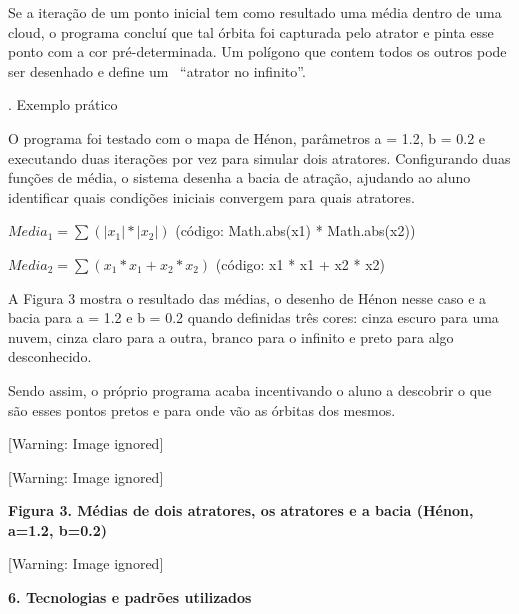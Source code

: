 \documentclass[12pt,twoside]{article}
\begin{document}
{
 Se a itera\c{c}\~ao de um ponto inicial tem como resultado uma m\'edia
dentro de uma cloud, o programa conclu\'i que tal \'orbita foi
capturada pelo atrator e pinta esse ponto com a cor
pr\'e{}-determinada. Um pol\'igono que contem todos os outros pode ser
desenhado e define um \ ``atrator no infinito''.}

{. Exemplo pr\'atico}

{
O programa foi testado com o mapa de H\'enon, par\^ametros a = 1.2, b =
0.2 e executando duas itera\c{c}\~oes por vez para simular dois
atratores. Configurando duas fun\c{c}\~oes de m\'edia, o sistema
desenha a bacia de atra\c{c}\~ao, ajudando ao aluno identificar quais
condi\c{c}\~oes iniciais convergem para quais atratores.}

{
  $\mathit{Media}_{1}=\sum {(\left|{x_{1}}\right|\ast
\left|{x_{2}}\right|)}$ (c\'odigo: Math.abs(x1) * Math.abs(x2))}

{
  $\mathit{Media}_{2}=\sum {(x_{1}\ast x_{1}+x_{2}\ast x_{2})}$
(c\'odigo: x1 * x1 + x2 * x2)}

{
 A Figura 3 mostra o resultado das m\'edias, o desenho de H\'enon nesse
caso e a bacia para a = 1.2 e b = 0.2 quando definidas tr\^es cores:
cinza escuro para uma nuvem, cinza claro para a outra, branco para o
infinito e preto para algo desconhecido.}

{
 Sendo assim, o pr\'oprio programa acaba incentivando o aluno a
descobrir o que s\~ao esses pontos pretos e para onde v\~ao as
\'orbitas dos mesmos.}

\begin{center}
 [Warning: Image ignored] %

\end{center}
\begin{center}
 [Warning: Image ignored] %

\end{center}
{\centering{}\sffamily\bfseries
\textrm{\textmd{Figura 3. M\'edias de dois atratores, os atratores e a
bacia (H\'enon, a=1.2, b=0.2)}}
\par}

\begin{center}
 [Warning: Image ignored] %

\end{center}
{\bfseries
6. Tecnologias e padr\~oes utilizados}
\end{document}
